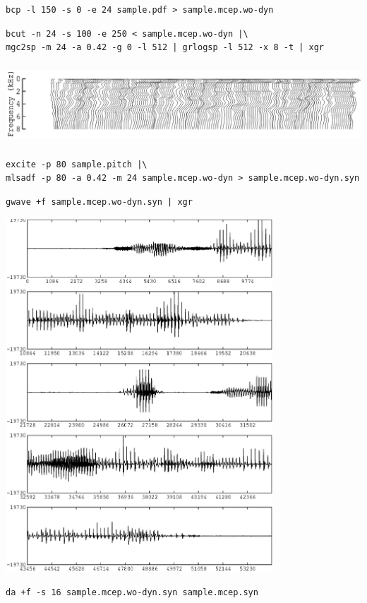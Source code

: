 \documentclass[a4paper,10pt]{article}
\begin{document}
\begin{verbatim}
bcp -l 150 -s 0 -e 24 sample.pdf > sample.mcep.wo-dyn
\end{verbatim}

\begin{verbatim}
bcut -n 24 -s 100 -e 250 < sample.mcep.wo-dyn |\
mgc2sp -m 24 -a 0.42 -g 0 -l 512 | grlogsp -l 512 -x 8 -t | xgr
\end{verbatim}

\includegraphics[height=3cm]{sample.mcep.wo-dyn.grlogsp-t.eps}

\begin{verbatim}
excite -p 80 sample.pitch |\
mlsadf -p 80 -a 0.42 -m 24 sample.mcep.wo-dyn > sample.mcep.wo-dyn.syn
\end{verbatim}

\begin{verbatim}
gwave +f sample.mcep.wo-dyn.syn | xgr
\end{verbatim}

\includegraphics[width=10cm]{sample.mcep.wo-dyn.syn.gwave.eps}

\begin{verbatim}
da +f -s 16 sample.mcep.wo-dyn.syn sample.mcep.syn
\end{verbatim}
\end{document}
